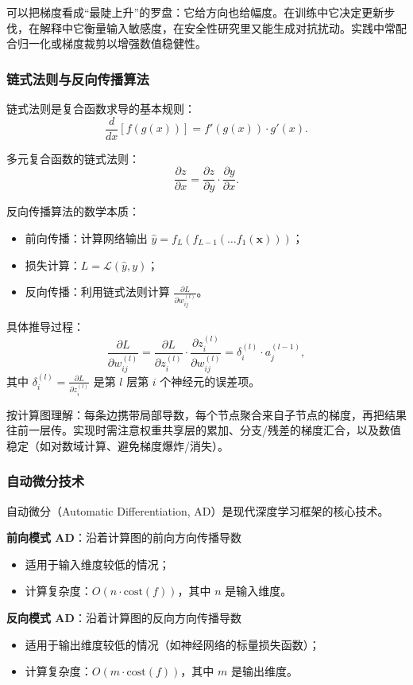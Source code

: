 可以把梯度看成“最陡上升”的罗盘：它给方向也给幅度。在训练中它决定更新步伐，在解释中它衡量输入敏感度，在安全性研究里又能生成对抗扰动。实践中常配合归一化或梯度裁剪以增强数值稳健性。

\subsubsection{链式法则与反向传播算法}

链式法则是复合函数求导的基本规则：
$$
\frac{d}{dx}[f(g(x))] = f'(g(x)) \cdot g'(x).
$$

多元复合函数的链式法则：
$$
\frac{\partial z}{\partial x} = \frac{\partial z}{\partial y} \cdot \frac{\partial y}{\partial x}.
$$

反向传播算法的数学本质：
\begin{itemize}
  \item 前向传播：计算网络输出 $\hat{y} = f_L(f_{L-1}(\ldots f_1(\mathbf{x})))$；
  \item 损失计算：$L = \mathcal{L}(\hat{y}, y)$；
  \item 反向传播：利用链式法则计算 $\frac{\partial L}{\partial w_{ij}^{(l)}}$。
\end{itemize}

具体推导过程：
$$
\frac{\partial L}{\partial w_{ij}^{(l)}} = \frac{\partial L}{\partial z_i^{(l)}} \cdot \frac{\partial z_i^{(l)}}{\partial w_{ij}^{(l)}} = \delta_i^{(l)} \cdot a_j^{(l-1)},
$$
其中 $\delta_i^{(l)} = \frac{\partial L}{\partial z_i^{(l)}}$ 是第 $l$ 层第 $i$ 个神经元的误差项。

按计算图理解：每条边携带局部导数，每个节点聚合来自子节点的梯度，再把结果往前一层传。实现时需注意权重共享层的累加、分支/残差的梯度汇合，以及数值稳定（如对数域计算、避免梯度爆炸/消失）。

\subsubsection{自动微分技术}

自动微分（Automatic Differentiation, AD）是现代深度学习框架的核心技术。

\textbf{前向模式 AD}：沿着计算图的前向方向传播导数
\begin{itemize}
  \item 适用于输入维度较低的情况；
  \item 计算复杂度：$O(n \cdot \text{cost}(f))$，其中 $n$ 是输入维度。
\end{itemize}

\textbf{反向模式 AD}：沿着计算图的反向方向传播导数
\begin{itemize}
  \item 适用于输出维度较低的情况（如神经网络的标量损失函数）；
  \item 计算复杂度：$O(m \cdot \text{cost}(f))$，其中 $m$ 是输出维度。
\end{itemize}

